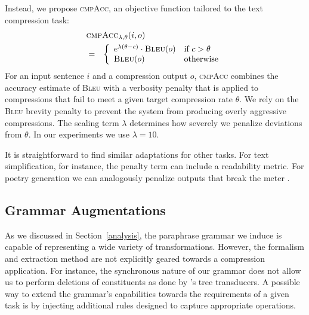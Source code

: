 \documentclass[11pt]{article}
\begin{document}

Instead, we propose \textsc{cmpAcc}, an objective function tailored to
the text compression task:
\vspace{-.2cm}
\begin{eqnarray}
  \lefteqn{ \textsc{cmpAcc}_{\lambda,\theta} (i, o) } \nonumber \\
  &=& \left\{ \begin{array}{ll}
      e^{\lambda (\theta - c)} \cdot \textsc{Bleu}(o) & \textrm{if
        $c > \theta$} \nonumber \\ 
      \textsc{Bleu}(o) & \textrm{otherwise}
\end{array} \right.
\end{eqnarray}
For an input sentence $i$ and a compression
output $o$, \textsc{cmpAcc} combines the accuracy estimate of
\textsc{Bleu} with a verbosity penalty that is applied to compressions
that fail to meet a given target compression rate $\theta$.  We
  rely on the \textsc{Bleu} brevity penalty to prevent the system from
  producing overly aggressive compressions. The scaling term $\lambda$
  determines how severely we penalize deviations from $\theta$. In our
experiments we use $\lambda = 10$.

It is straightforward to find similar adaptations for other tasks. For
text simplification, for instance, the penalty term can include a
readability metric. For poetry generation we can analogously penalize
outputs that break the meter \cite{Greene2010}.

\subsection{Grammar Augmentations} \label{injection}

As we discussed in Section~\ref{analysis}, the paraphrase grammar we
induce is capable of representing a wide variety of
transformations. However, the formalism and extraction method are not
explicitly geared towards a compression application. For instance,
the synchronous nature of our grammar does not allow us to perform
deletions of constituents as done by 's tree
transducers.  A possible way to extend the grammar's capabilities
towards the requirements of a given task is by injecting additional
rules designed to capture appropriate operations.
\end{document}
